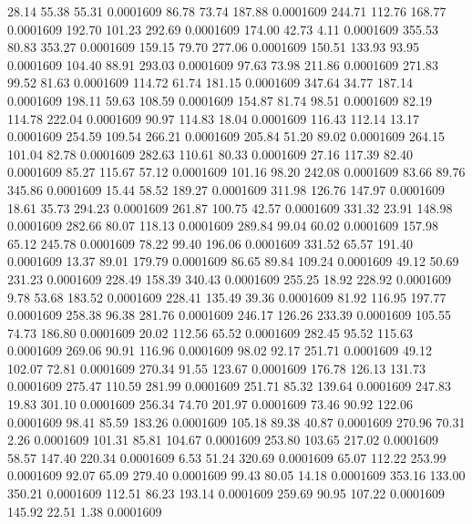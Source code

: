   28.14   55.38   55.31   0.0001609
  86.78   73.74  187.88   0.0001609
 244.71  112.76  168.77   0.0001609
 192.70  101.23  292.69   0.0001609
 174.00   42.73    4.11   0.0001609
 355.53   80.83  353.27   0.0001609
 159.15   79.70  277.06   0.0001609
 150.51  133.93   93.95   0.0001609
 104.40   88.91  293.03   0.0001609
  97.63   73.98  211.86   0.0001609
 271.83   99.52   81.63   0.0001609
 114.72   61.74  181.15   0.0001609
 347.64   34.77  187.14   0.0001609
 198.11   59.63  108.59   0.0001609
 154.87   81.74   98.51   0.0001609
  82.19  114.78  222.04   0.0001609
  90.97  114.83   18.04   0.0001609
 116.43  112.14   13.17   0.0001609
 254.59  109.54  266.21   0.0001609
 205.84   51.20   89.02   0.0001609
 264.15  101.04   82.78   0.0001609
 282.63  110.61   80.33   0.0001609
  27.16  117.39   82.40   0.0001609
  85.27  115.67   57.12   0.0001609
 101.16   98.20  242.08   0.0001609
  83.66   89.76  345.86   0.0001609
  15.44   58.52  189.27   0.0001609
 311.98  126.76  147.97   0.0001609
  18.61   35.73  294.23   0.0001609
 261.87  100.75   42.57   0.0001609
 331.32   23.91  148.98   0.0001609
 282.66   80.07  118.13   0.0001609
 289.84   99.04   60.02   0.0001609
 157.98   65.12  245.78   0.0001609
  78.22   99.40  196.06   0.0001609
 331.52   65.57  191.40   0.0001609
  13.37   89.01  179.79   0.0001609
  86.65   89.84  109.24   0.0001609
  49.12   50.69  231.23   0.0001609
 228.49  158.39  340.43   0.0001609
 255.25   18.92  228.92   0.0001609
   9.78   53.68  183.52   0.0001609
 228.41  135.49   39.36   0.0001609
  81.92  116.95  197.77   0.0001609
 258.38   96.38  281.76   0.0001609
 246.17  126.26  233.39   0.0001609
 105.55   74.73  186.80   0.0001609
  20.02  112.56   65.52   0.0001609
 282.45   95.52  115.63   0.0001609
 269.06   90.91  116.96   0.0001609
  98.02   92.17  251.71   0.0001609
  49.12  102.07   72.81   0.0001609
 270.34   91.55  123.67   0.0001609
 176.78  126.13  131.73   0.0001609
 275.47  110.59  281.99   0.0001609
 251.71   85.32  139.64   0.0001609
 247.83   19.83  301.10   0.0001609
 256.34   74.70  201.97   0.0001609
  73.46   90.92  122.06   0.0001609
  98.41   85.59  183.26   0.0001609
 105.18   89.38   40.87   0.0001609
 270.96   70.31    2.26   0.0001609
 101.31   85.81  104.67   0.0001609
 253.80  103.65  217.02   0.0001609
  58.57  147.40  220.34   0.0001609
   6.53   51.24  320.69   0.0001609
  65.07  112.22  253.99   0.0001609
  92.07   65.09  279.40   0.0001609
  99.43   80.05   14.18   0.0001609
 353.16  133.00  350.21   0.0001609
 112.51   86.23  193.14   0.0001609
 259.69   90.95  107.22   0.0001609
 145.92   22.51    1.38   0.0001609
